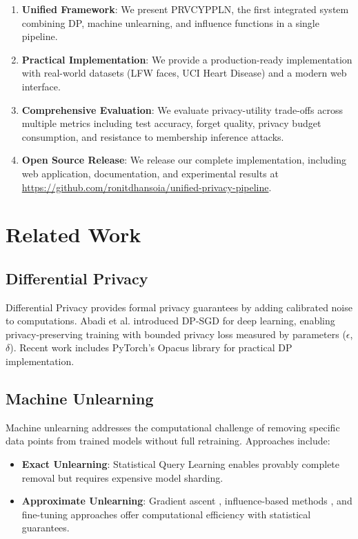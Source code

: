 \documentclass[conference]{IEEEtran}
\begin{document}
\begin{enumerate}
    \item \textbf{Unified Framework}: We present PRVCYPPLN, the first integrated system combining DP, machine unlearning, and influence functions in a single pipeline.
    \item \textbf{Practical Implementation}: We provide a production-ready implementation with real-world datasets (LFW faces, UCI Heart Disease) and a modern web interface.
    \item \textbf{Comprehensive Evaluation}: We evaluate privacy-utility trade-offs across multiple metrics including test accuracy, forget quality, privacy budget consumption, and resistance to membership inference attacks.
    \item \textbf{Open Source Release}: We release our complete implementation, including web application, documentation, and experimental results at \url{https://github.com/ronitdhansoia/unified-privacy-pipeline}.
\end{enumerate}

\section{Related Work}

\subsection{Differential Privacy}

Differential Privacy \cite{dwork2006differential} provides formal privacy guarantees by adding calibrated noise to computations. Abadi et al. \cite{abadi2016deep} introduced DP-SGD for deep learning, enabling privacy-preserving training with bounded privacy loss measured by parameters ($\epsilon$, $\delta$). Recent work includes PyTorch's Opacus library \cite{yousefpour2021opacus} for practical DP implementation.

\subsection{Machine Unlearning}

Machine unlearning addresses the computational challenge of removing specific data points from trained models without full retraining. Approaches include:

\begin{itemize}
    \item \textbf{Exact Unlearning}: Statistical Query Learning \cite{bourtoule2021machine} enables provably complete removal but requires expensive model sharding.
    \item \textbf{Approximate Unlearning}: Gradient ascent \cite{golatkar2020eternal}, influence-based methods \cite{guo2019certified}, and fine-tuning approaches offer computational efficiency with statistical guarantees.
\end{itemize}
\end{document}
